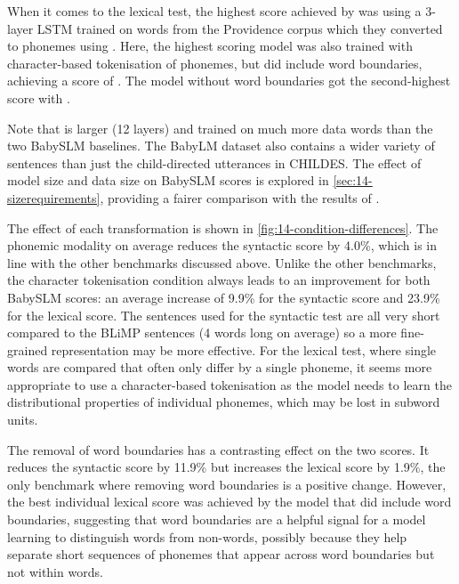 When it comes to the lexical test, the highest score achieved by \citet{lavechin} was  using a 3-layer LSTM trained on  words from the Providence corpus \citep{borschinger-etal-2013-joint} which they converted to phonemes using \phonemizer. Here, the highest scoring model was also trained with character-based tokenisation of phonemes, but did include word boundaries, achieving a score of . The model without word boundaries got the second-highest score with .

Note that \gpt is larger (12 layers) and trained on much more data  words than the two BabySLM baselines. The BabyLM dataset also contains a wider variety of sentences than just the child-directed utterances in CHILDES. The effect of model size and data size on BabySLM scores is explored in \cref{sec:14-sizerequirements}, providing a fairer comparison with the results of \citet{lavechin}.


The effect of each transformation is shown in \cref{fig:14-condition-differences}. The phonemic modality on average reduces the syntactic score by 4.0\%, which is in line with the other benchmarks discussed above. Unlike the other benchmarks, the character tokenisation condition always leads to an improvement for both BabySLM scores: an average increase of 9.9\% for the syntactic score and 23.9\% for the lexical score. The sentences used for the syntactic test are all very short compared to the BLiMP sentences (4 words long on average) so a more fine-grained representation may be more effective. For the lexical test, where single words are compared that often only differ by a single phoneme, it seems more appropriate to use a character-based tokenisation as the model needs to learn the distributional properties of individual phonemes, which may be lost in subword units. 

The removal of word boundaries has a contrasting effect on the two scores. It reduces the syntactic score by 11.9\% but increases the lexical score by 1.9\%, the only benchmark where removing word boundaries is a positive change. However, the best individual lexical score was achieved by the model that did include word boundaries, suggesting that word boundaries are a helpful signal for a model learning to distinguish words from non-words, possibly because they help separate short sequences of phonemes that appear across word boundaries but not within words. 

